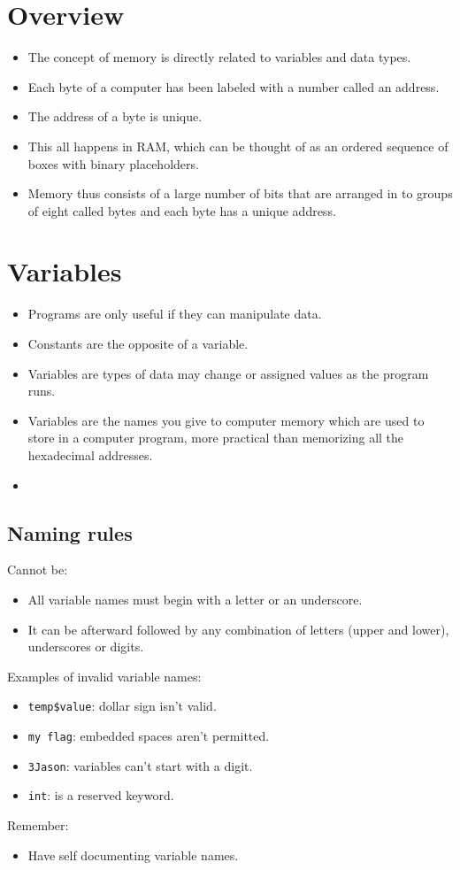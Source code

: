 \section{Overview}
\begin{itemize}
    \item The concept of memory is directly related to variables and data types. 
    \item Each byte of a computer has been labeled with a number called an address.
    \item The address of a byte is unique.
    \item This all happens in RAM, which can be thought of as an ordered sequence of boxes with binary placeholders. 
    \item Memory thus consists of a large number of bits that are arranged in to groups of eight called bytes and each byte has a unique address. 
\end{itemize}

\section{Variables}
\begin{itemize}
    \item Programs are only useful if they can manipulate data. 
    \item Constants are the opposite of a variable.
    \item Variables are types of data may change or assigned values as the program runs.
    \item Variables are the names you give to computer memory which are used to store in a computer program, more practical than memorizing all the hexadecimal addresses. 
    \item 
\end{itemize}

\subsection{Naming rules}
Cannot be: 
\begin{itemize}
    \item All variable names must begin with a letter or an underscore.
    \item It can be afterward followed by any combination of letters (upper and lower), underscores or digits. 
\end{itemize}
Examples of invalid variable names: 
\begin{itemize}
    \item \verb|temp$value|: dollar sign isn't valid.
    \item \verb|my flag|: embedded spaces aren't permitted.
    \item \verb|3Jason|: variables can't start with a digit. 
    \item \verb|int|: is a reserved keyword. 
\end{itemize}
Remember: 
\begin{itemize}
    \item Have self documenting variable names.
\end{itemize}

